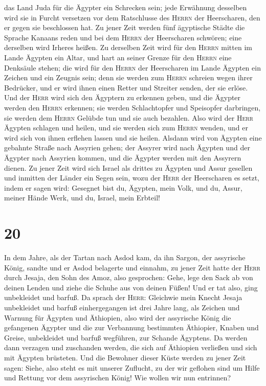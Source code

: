 das Land Juda für die Ägypter ein Schrecken sein; jede Erwähnung
desselben wird sie in Furcht versetzen vor dem Ratschlusse des
\textsc{Herrn} der Heerscharen, den er gegen sie beschlossen hat.
 Zu jener Zeit werden fünf ägyptische Städte die Sprache
Kanaans reden und bei dem \textsc{Herrn} der Heerscharen schwören; eine
derselben wird Irheres heißen.  Zu derselben Zeit wird
für den \textsc{Herrn} mitten im Lande Ägypten ein Altar, und hart an
seiner Grenze für den \textsc{Herrn} eine Denksäule stehen;
 die wird für den \textsc{Herrn} der Heerscharen im Lande
Ägypten ein Zeichen und ein Zeugnis sein; denn sie werden zum
\textsc{Herrn} schreien wegen ihrer Bedrücker, und er wird ihnen einen
Retter und Streiter senden, der sie erlöse.  Und der
\textsc{Herr} wird sich den Ägyptern zu erkennen geben, und die Ägypter
werden den \textsc{Herrn} erkennen; sie werden Schlachtopfer und
Speisopfer darbringen, sie werden dem \textsc{Herrn} Gelübde tun und sie
auch bezahlen.  Also wird der \textsc{Herr} Ägypten
schlagen und heilen, und sie werden sich zum \textsc{Herrn} wenden, und
er wird sich von ihnen erflehen lassen und sie heilen. 
Alsdann wird von Ägypten eine gebahnte Straße nach Assyrien gehen; der
Assyrer wird nach Ägypten und der Ägypter nach Assyrien kommen, und die
Ägypter werden mit den Assyrern dienen.  Zu jener Zeit
wird sich Israel als drittes zu Ägypten und Assur gesellen und inmitten
der Länder ein Segen sein,  wozu der \textsc{Herr} der
Heerscharen es setzt, indem er sagen wird: Gesegnet bist du, Ägypten,
mein Volk, und du, Assur, meiner Hände Werk, und du, Israel, mein
Erbteil!

\hypertarget{section-19}{%
\section{20}\label{section-19}}

 In dem Jahre, als der Tartan nach Asdod kam, da ihn
Sargon, der assyrische König, sandte und er Asdod belagerte und einnahm,
 zu jener Zeit hatte der \textsc{Herr} durch Jesaja, den
Sohn des Amoz, also gesprochen: Gehe, lege den Sack ab von deinen Lenden
und ziehe die Schuhe aus von deinen Füßen! Und er tat also, ging
unbekleidet und barfuß.  Da sprach der \textsc{Herr}:
Gleichwie mein Knecht Jesaja unbekleidet und barfuß einhergegangen ist
drei Jahre lang, als Zeichen und Warnung für Ägypten und Äthiopien,
 also wird der assyrische König die gefangenen Ägypter und
die zur Verbannung bestimmten Äthiopier, Knaben und Greise, unbekleidet
und barfuß wegführen, zur Schande Ägyptens.  Da werden
dann verzagen und zuschanden werden, die sich auf Äthiopien verließen
und sich mit Ägypten brüsteten.  Und die Bewohner dieser
Küste werden zu jener Zeit sagen: Siehe, also steht es mit unserer
Zuflucht, zu der wir geflohen sind um Hilfe und Rettung vor dem
assyrischen König! Wie wollen wir nun entrinnen?

